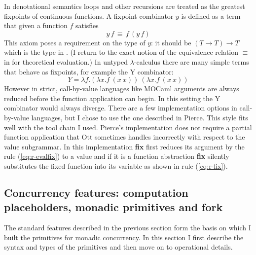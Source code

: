 \documentclass[12pt,twoside,notitlepage]{report}
\theoremstyle{plain}%
\theoremstyle{definition}
\theoremstyle{remark}
\begin{document}
In denotational semantics loops and other recursions are treated as the greatest fixpoints of continuous functions. A fixpoint combinator $ y $ is defined as a term that given a function $ f $ satisfies
\[ y\,f\,\equiv\, f\,(y\,f) \] 
This axiom poses a requirement on the type of $ y $: it should be $ (T \rightarrow T) \rightarrow T $ which is the type in . (I return to the exact notion of the equivalence relation $ \equiv $ in  for theoretical evaluation.)
In untyped $ \lambda $-calculus there are many simple terms that behave as fixpoints, for example the Y combinator:
\[ Y = \lambda f.(\lambda x.f\ (x\ x))\ (\lambda x.f\ (x\ x))  \]
However in strict, call-by-value languages like MOCaml arguments are always reduced before the function application can begin. In this setting the Y combinator would always diverge. There are a few implementation options in call-by-value languages, but I chose to use the one described in Pierce\cite[p.~144]{pierce2002types}. This style fits well with the tool chain I used. Pierce's implementation does not require a partial function application that Ott sometimes handles incorrectly with respect to the value subgrammar. In this implementation \textbf{fix} first reduces its argument by the rule (\ref{eq:r-evalfix}) to a value and if it is a function abstraction \textbf{fix} silently substitutes the fixed function into its variable as shown in rule (\ref{eq:r-fix}).
\clearpage

\subsection{Concurrency features: computation placeholders, monadic primitives and fork}
The standard features described in the previous section form the basis on which I built the primitives for monadic concurrency. In this section I first describe the syntax and types of the primitives and then move on to operational details.
\end{document}
